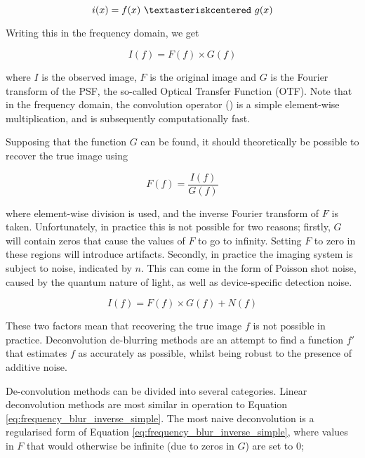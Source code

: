\begin{equation}
\label{eq:spatial_blur_simple}
i(x) = f(x)~\textasteriskcentered~g(x)
\end{equation}

Writing this in the frequency domain, we get

\begin{equation}
\label{eq:frequency_blur_simple}
I(f) = F(f) \times G(f)
\end{equation}

\noindent
where $I$ is the observed image, $F$ is the original image and $G$ is the Fourier transform of the PSF, the so-called Optical Transfer Function (OTF).
Note that in the frequency domain, the convolution operator (\textasteriskcentered) is a simple element-wise multiplication, and is subsequently computationally fast.

Supposing that the function $G$ can be found, it should theoretically be possible to recover the true image using

\begin{equation}
\label{eq:frequency_blur_inverse_simple}
F(f) = \frac{I(f)}{G(f)}
\end{equation}

\noindent
where element-wise division is used, and the inverse Fourier transform of $F$ is taken.
Unfortunately, in practice this is not possible for two reasons; firstly, $G$ will contain zeros that cause the values of $F$ to go to infinity.
Setting $F$ to zero in these regions will introduce artifacts.
Secondly, in practice the imaging system is subject to noise, indicated by $n$.
This can come in the form of Poisson shot noise, caused by the quantum nature of light, as well as device-specific detection noise.

\begin{equation}
\label{eq:frequency_blur_full}
I(f) = F(f) \times G(f) + N(f)
\end{equation}

These two factors mean that recovering the true image $f$ is not possible in practice.
Deconvolution de-blurring methods are an attempt to find a function $f'$ that estimates $f$ as accurately as possible, whilst being robust to the presence of additive noise.

De-convolution methods can be divided into several categories.
Linear deconvolution methods are most similar in operation to Equation \ref{eq:frequency_blur_inverse_simple}.
The most naive deconvolution is a regularised form of Equation \ref{eq:frequency_blur_inverse_simple}, where values in $F$ that would otherwise be infinite (due to zeros in $G$) are set to 0;

